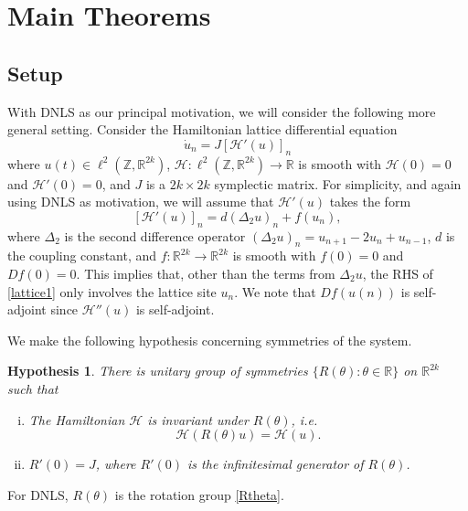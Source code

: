 \documentclass[12pt]{elsarticle}
\def\R{{\mathbb R}}
\def\Z{{\mathbb Z}}
\newtheorem{hypothesis}{Hypothesis}
\begin{document}
\section{Main Theorems}

\subsection{Setup}

With DNLS as our principal motivation, we will consider the following more general setting. Consider the Hamiltonian lattice differential equation 
\begin{equation}\label{lattice1}
\dot{u}_n = J [\mathcal{H}'(u)]_n
\end{equation}
where $u(t) \in \ell^2(\Z, \R^{2k})$, $\mathcal{H}: \ell^2(\Z, \R^{2k}) \rightarrow \R$ is smooth with $\mathcal{H}(0) = 0$ and $\mathcal{H}'(0) = 0$, and $J$ is a $2k \times 2k$ symplectic matrix. For simplicity, and again using DNLS as motivation, we will assume that $\mathcal{H}'(u)$ takes the form
\begin{equation}\label{latticeform}
[\mathcal{H}'(u)]_n = d (\Delta_2 u)_n + f(u_n),
\end{equation}
where $\Delta_2$ is the second difference operator $(\Delta_2 u)_n = u_{n+1} - 2 u_n + u_{n-1}$, $d$ is the coupling constant, and $f: \R^{2k} \rightarrow \R^{2k}$ is smooth with $f(0) = 0$ and $Df(0) = 0$. This implies that, other than the terms from $\Delta_2 u$, the RHS of \eqref{lattice1} only involves the lattice site $u_n$. We note that $Df(u(n))$ is self-adjoint since $\mathcal{H}''(u)$ is self-adjoint.

We make the following hypothesis concerning symmetries of the system.
\begin{hypothesis}\label{symmetryhyp}
There is unitary group of symmetries $\{ R(\theta) : \theta \in \R \}$ on $\R^{2k}$ such that 
\begin{enumerate}[(i)]
\item The Hamiltonian $\mathcal{H}$ is invariant under $R(\theta)$, i.e. 
\begin{equation}\label{Hinvariance}
\mathcal{H}(R(\theta)u) = \mathcal{H}(u).
\end{equation}
\item $R'(0) = J$, where $R'(0)$ is the infinitesimal generator of $R(\theta)$.
\end{enumerate}
\end{hypothesis}
\noindent For DNLS, $R(\theta)$ is the rotation group \eqref{Rtheta}.
\end{document}
